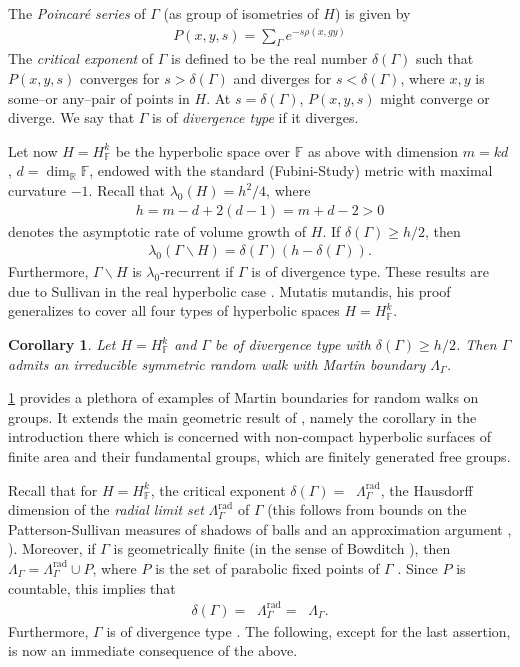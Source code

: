 \documentclass[12pt,a4paper]{amsart}
\newcounter{alph}
\newtheorem{coro}[alph]{Corollary}
\numberwithin{equation}{section}
\theoremstyle{definition}
\DeclareMathOperator{\Hdim}{dim_{Hd}}
\DeclareMathOperator{\rad}{rad}
\def\F{\mathbb F}
\def\R{\mathbb R}
\begin{document}
The \emph{Poincar\'e series} of $\Gamma$ (as group of isometries of $H$) is given by
\begin{align}
    P(x,y,s) = \sum_\Gamma e^{-s\rho(x,gy)}
\end{align}
The \emph{critical exponent} of $\Gamma$ is defined to be the real number $\delta(\Gamma)$ such that $P(x,y,s)$ converges for $s>\delta(\Gamma)$ and diverges for $s<\delta(\Gamma)$, where $x,y$ is some--or any--pair of points in $H$.
At $s=\delta(\Gamma)$, $P(x,y,s)$ might converge or diverge.
We say that $\Gamma$ is of \emph{divergence type} if it diverges.

Let now $H=H_\F^k$ be the hyperbolic space over $\F$ as above with dimension $m=kd$, $d=\dim_{\R}\F$, endowed with the standard (Fubini-Study) metric with maximal curvature $-1$.
Recall that $\lambda_0(H)=h^2/4$, where
\begin{align}\label{volentin}
    h = m - d + 2(d-1) = m + d - 2 > 0
\end{align}
denotes the asymptotic rate of volume growth of $H$.
If $\delta(\Gamma)\ge h/2$, then
\begin{align}
    \lambda_0(\Gamma\backslash H)=\delta(\Gamma)(h-\delta(\Gamma)).
\end{align}
Furthermore, $\Gamma\backslash H$ is $\lambda_0$-recurrent if $\Gamma$ is of divergence type.
These results are due to Sullivan in the real hyperbolic case \cite[Corollary 2.18]{Su3}.
Mutatis mutandis, his proof generalizes to cover all four types of hyperbolic spaces $H=H_\F^k$.

\begin{coro}\label{main3}
Let $H=H_\F^k$ and $\Gamma$ be of divergence type with $\delta(\Gamma)\ge h/2$.
Then $\Gamma$ admits an irreducible symmetric random walk with Martin boundary $\Lambda_\Gamma$.
\end{coro}

\cref{main3} provides a plethora of examples of Martin boundaries for random walks on groups.
It extends the main geometric result of \cite{BL2}, namely the corollary in the introduction there which is concerned with non-compact hyperbolic surfaces of finite area and their fundamental groups, which are finitely generated free groups.

Recall that for $H=H_\F^k$, the critical exponent $\delta(\Gamma)=\Hdim\Lambda_\Gamma^{\rad}$, the Hausdorff dimension of the \emph{radial limit set} $\Lambda_\Gamma^{\rad}$ of $\Gamma$ (this follows from bounds on the Patterson-Sullivan measures of shadows of balls \cite[Theorem 4.2]{Sch} and an approximation argument \cite[Proposition 4.10]{SV},  \cite[Theorem 0.3]{Nan}).
Moreover, if $\Gamma$ is geometrically finite (in the sense of Bowditch \cite{Bo}), then $\Lambda_\Gamma=\Lambda_\Gamma^{\rad}\cup P$, where $P$ is the set of parabolic fixed points of $\Gamma$ \cite[Theorem 2.3]{CI}.
Since $P$ is countable, this implies that
\begin{align}\label{hauscri}
    \delta(\Gamma)=\Hdim\Lambda_\Gamma^{\rad}=\Hdim\Lambda_\Gamma.
\end{align}
Furthermore, $\Gamma$ is of divergence type \cite[Proposition 3.7]{CI}.
The following, except for the last assertion, is now an immediate consequence of the above.
\end{document}
